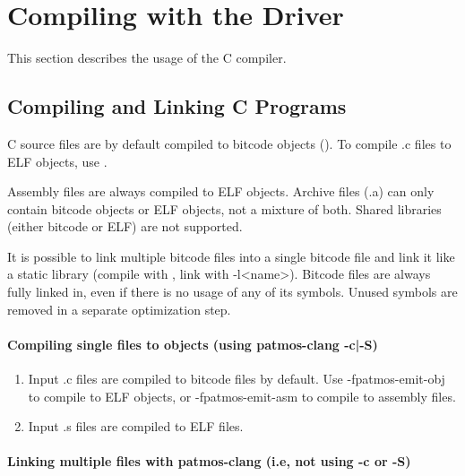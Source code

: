 \section{Compiling with the  Driver}

This section describes the usage of the  C compiler.

\subsection{Compiling and Linking C Programs}

C source files are by default compiled to bitcode objects (). To compile .c files
to ELF objects, use .

Assembly files are always compiled to ELF objects. Archive files (.a) can only contain bitcode objects
or ELF objects, not a mixture of both. Shared libraries (either bitcode or ELF) are not supported.

It is possible to link multiple bitcode files into a single bitcode file and link it like a static library
(compile with , link with -l<name>). Bitcode files are always
fully linked in, even if there is no usage of any of its symbols. Unused symbols are removed in a separate
optimization step.




\paragraph{Compiling single files to objects (using patmos-clang -c|-S)}

\begin{enumerate}
\item Input .c files are compiled to bitcode files by default. Use -fpatmos-emit-obj to compile
   to ELF objects, or -fpatmos-emit-asm to compile to assembly files.

\item Input .s files are compiled to ELF files.
\end{enumerate}


\paragraph{Linking multiple files with patmos-clang (i.e, not using -c or -S)}

